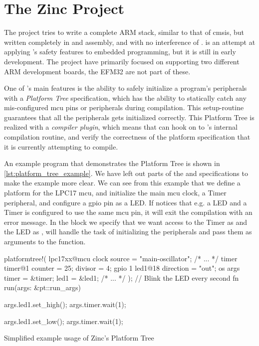 
\section{The Zinc Project} %
\label{sec:zinc}

The {\zinc} \cite{web:zinc} project tries to write a complete ARM stack, similar to that of \gls{cmsis}, but written completely in {\rust} and assembly, and with no interference of {\C}.
{\zinc} is an attempt at applying {\rust}'s safety features to embedded programming, but it is still in early development.
The project have primarily focused on supporting two different ARM development boards, the EFM32 are not part of these.

One of {\zinc}'s main features is the ability to safely initialize a program's peripherals with a \emph{Platform Tree} specification, which has the ability to statically catch any mis-configured \gls{mcu} pins or peripherals during compilation.
This setup-routine guarantees that all the peripherals gets initialized correctly.
This Platform Tree is realized with a {\rust} \emph{compiler plugin}, which means that {\zinc} can hook on to {\rustc}'s internal compilation routine, and verify the correctness of the platform specification that it is currently attempting to compile.

An example program that demonstrates the Platform Tree is shown in \autoref{lst:platform_tree_example}.
We have left out parts of the  and  specifications to make the example more clear.
We can see from this example that we define a platform for the LPC17 \gls{mcu}, and initialize the main \gls{mcu} clock, a Timer peripheral, and configure a \gls{gpio} pin as a LED.
If {\zinc} notices that e.g. a LED and a Timer is configured to use the same \gls{mcu} pin, it will exit the compilation with an error message.
In the  block we specify that we want access to the Timer as  and the LED as , {\zinc} will handle the task of initializing the peripherals and pass them as arguments to the  function.

\begin{listing}[H]
  \begin{rustcode}
platformtree!(
  lpc17xx@mcu {
    clock { source = "main-oscillator"; /* ... */ }
    timer { timer@1 { counter = 25;  divisor = 4; } }
    gpio { 1 { led1@18 { direction = "out"; } } }
  }
  os {
    args { timer = &timer; led1 = &led1; }
    /* ... */
  }
);
// Blink the LED every second
fn run(args: &pt::run_args) {
  args.led1.set_high();
  args.timer.wait(1);

  args.led1.set_low();
  args.timer.wait(1);
}
  \end{rustcode}
  \caption{Simplified example usage of Zinc's Platform Tree}
  \label{lst:platform_tree_example}
\end{listing}

